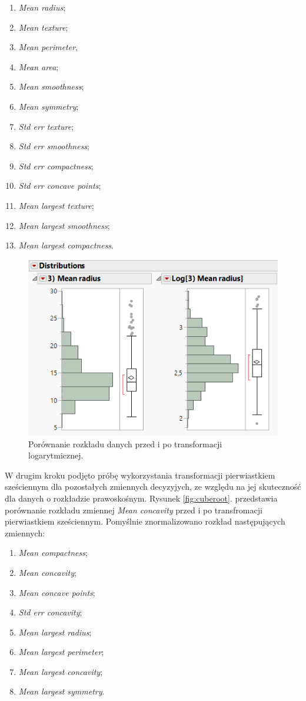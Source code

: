 	\begin{enumerate}
		\item \textit{Mean radius};
		\item \textit{Mean texture};
		\item \textit{Mean perimeter},
		\item \textit{Mean area};
		\item \textit{Mean smoothness};
		\item \textit{Mean symmetry};
		\item \textit{Std err texture};
		\item \textit{Std err smoothness};
		\item \textit{Std err compactness};
		\item \textit{Std err concave points};
		\item \textit{Mean largest texture};
		\item \textit{Mean largest smoothness};
		\item \textit{Mean largest compactness}.
	\end{enumerate}

	\begin{figure}[!ht]
		\centering
		\includegraphics[width=0.7\linewidth]{Rysunki/Rozdzial3/log}
		\caption{Porównanie rozkładu danych przed i po transformacji logarytmicznej.}
		\label{fig:log}
	\end{figure}

	W drugim kroku podjęto próbę wykorzystania transformacji pierwiastkiem sześciennym dla pozostałych zmiennych decyzyjych, ze względu na jej skuteczność dla danych o rozkładzie prawoskośnym. Rysunek \ref{fig:cuberoot}. przedstawia porównanie rozkładu zmiennej \textit{Mean concavity} przed i po transfromacji pierwiastkiem sześciennym. Pomyślnie znormalizowano rozkład następujących zmiennych:
	
	\begin{enumerate}
		\item \textit{Mean compactness};
		\item \textit{Mean concavity};
		\item \textit{Mean concave points};
		\item \textit{Std err concavity};
		\item \textit{Mean largest radius};
		\item \textit{Mean largest perimeter};
		\item \textit{Mean largest concavity};
		\item \textit{Mean largest symmetry}.
	\end{enumerate} 

